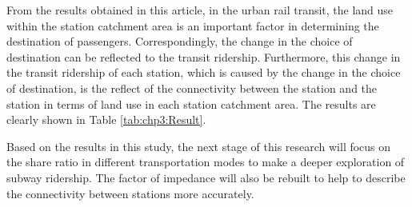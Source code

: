 %
From the results obtained in this article, in the urban rail transit, the land use within the station catchment area is an important factor in determining the destination of passengers. Correspondingly, the change in the choice of destination can be reflected to the transit ridership. Furthermore, this change in the transit ridership of each station, which is caused by the change in the choice of destination, is the reflect of the connectivity between the station and the station in terms of land use in each station catchment area. The results are clearly shown in Table \ref{tab:chp3:Result}.

%
Based on the results in this study, the next stage of this research will focus on the share ratio in different transportation modes to make a deeper exploration of subway ridership. The factor of impedance will also be rebuilt to help to describe the connectivity between stations more accurately.

\clearpage %

